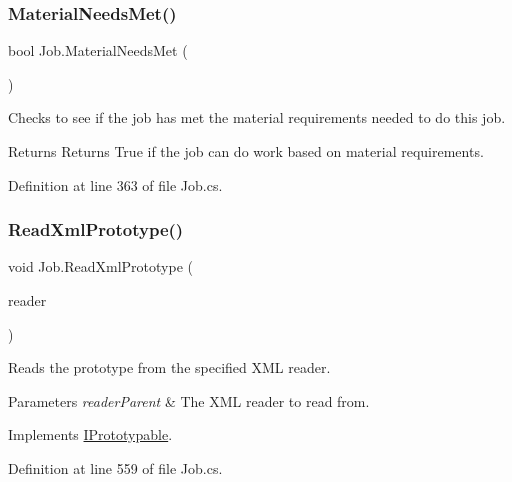 \mbox{\label{class_job_a31ad0e22267859ee2a2574cf5e49cac1}} 
\subsubsection{\texorpdfstring{Material\+Needs\+Met()}{MaterialNeedsMet()}}
{\footnotesize\ttfamily bool Job.\+Material\+Needs\+Met (\begin{DoxyParamCaption}{ }\end{DoxyParamCaption})}



Checks to see if the job has met the material requirements needed to do this job. 

\begin{DoxyReturn}{Returns}
Returns True if the job can do work based on material requirements.
\end{DoxyReturn}


Definition at line 363 of file Job.\+cs.

\mbox{\label{class_job_a4f006710b0158ef22c0b4c5b8ca63e6f}} 
\subsubsection{\texorpdfstring{Read\+Xml\+Prototype()}{ReadXmlPrototype()}}
{\footnotesize\ttfamily void Job.\+Read\+Xml\+Prototype (\begin{DoxyParamCaption}\item[{Xml\+Reader}]{reader }\end{DoxyParamCaption})}



Reads the prototype from the specified X\+ML reader. 


\begin{DoxyParams}{Parameters}
{\em reader\+Parent} & The X\+ML reader to read from.\\
\hline
\end{DoxyParams}


Implements \hyperlink{interface_i_prototypable_a024d752c4be655a7166db5718f1fad6a}{I\+Prototypable}.



Definition at line 559 of file Job.\+cs.

